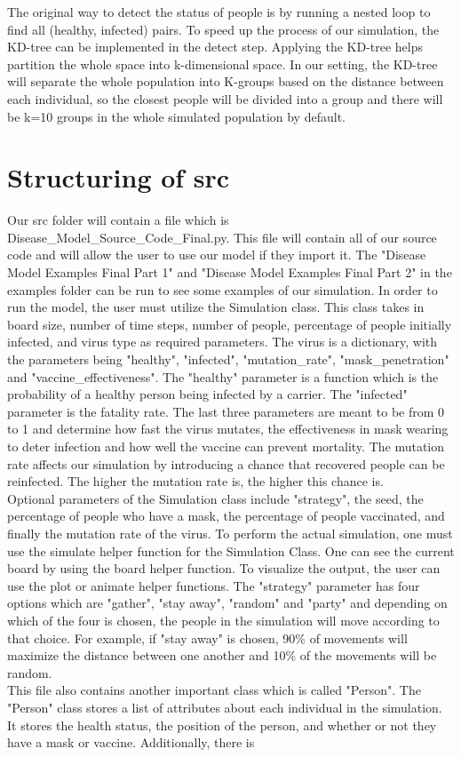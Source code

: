 \documentclass{article}
\begin{document}
\indent The original way to detect the status of people is by running a nested loop to find all (healthy, infected) pairs. To speed up the process of our simulation, the KD-tree can be implemented in the detect step. Applying the KD-tree helps partition the whole space into k-dimensional space. In our setting, the KD-tree will separate the whole population into K-groups based on the distance between each individual, so the closest people will be divided into a group and there will be k=10 groups in the whole simulated population by default. 

\section{Structuring of src}

Our src folder will contain a file which is Disease\_Model\_Source\_Code\_Final.py. This file will contain all of our source code and will allow the user to use our model if they import it. The "Disease Model Examples Final Part 1" and "Disease Model Examples Final Part 2" in the examples folder can be run to see some examples of our simulation. In order to run the model, the user must utilize the Simulation class. This class takes in board size, number of time steps, number of people, percentage of people initially infected, and virus type as required parameters. The virus is a dictionary, with the parameters being "healthy", "infected", "mutation\_rate", "mask\_penetration" and "vaccine\_effectiveness". The "healthy" parameter is a function which is the probability of a healthy person being infected by a carrier. The "infected" parameter is the fatality rate. The last three parameters are meant to be from 0 to 1 and determine how fast the virus mutates, the effectiveness in mask wearing to deter infection and how well the vaccine can prevent mortality. The mutation rate affects our simulation by introducing a chance that recovered people can be reinfected. The higher the mutation rate is, the higher this chance is.\\ \indent Optional parameters of the Simulation class include "strategy", the seed, the percentage of people who have a mask, the percentage of people vaccinated, and finally the mutation rate of the virus. To perform the actual simulation, one must use the simulate helper function for the Simulation Class. One can see the current board by using the board helper function. To visualize the output, the user can use the plot or animate helper functions. The "strategy" parameter has four options which are "gather", "stay away", "random" and "party" and depending on which of the four is chosen, the people in the simulation will move according to that choice. For example, if "stay away" is chosen, 90\% of movements will maximize the distance between one another and 10\% of the movements will be random. \\ \indent This file also contains another important class which is called "Person". The "Person" class stores a list of attributes about each individual in the simulation. It stores the health status, the position of the person, and whether or not they have a mask or vaccine. Additionally, there is 
\end{document}

